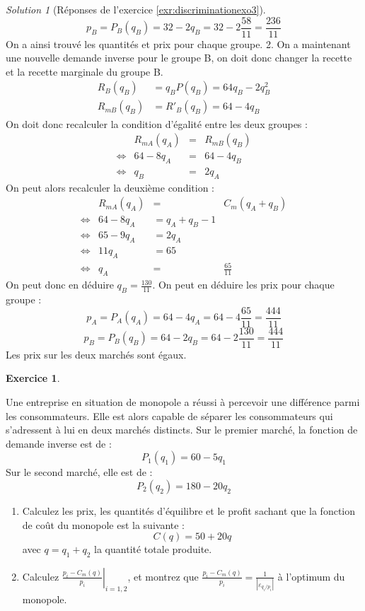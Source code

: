 \documentclass[
]{book}
\providecommand{\tightlist}{%
  \setlength{\itemsep}{0pt}\setlength{\parskip}{0pt}}
\theoremstyle{definition}
\theoremstyle{definition}
\theoremstyle{definition}
\newtheorem{exercise}{Exercice}[chapter]
\theoremstyle{definition}
\theoremstyle{remark}
\newtheorem*{solution}{Solution}
\begin{document}
\begin{solution}[Réponses de l'exercice \ref{exr:discriminationexo3}]
\[p_B=P_B(q_B)=32-2q_B=32-2\frac{58}{11}=\frac{236}{11}\]
On a ainsi trouvé les quantités et prix pour chaque groupe.
2. On a maintenant une nouvelle demande inverse pour le groupe B, on doit donc changer la recette et la recette marginale du groupe B.
\[
\begin{array}{rl}
R_B(q_B)&=q_BP(q_B)=64q_B-2q_B^2\\
R_{mB}(q_B)&=R'_B(q_B)=64-4q_B
\end{array}
\]
On doit donc recalculer la condition d'égalité entre les deux groupes :
\[
\begin{array}{crcl}
&R_{mA}(q_A)&=&R_{mB}(q_B)\\
\Leftrightarrow&64-8q_A&=&64-4q_B\\
\Leftrightarrow&q_B&=&2q_A
\end{array}
\]
On peut alors recalculer la deuxième condition :
\[
\begin{array}{crcl}
&R_{mA}(q_A)&=&C_m(q_A+q_B)\\
\Leftrightarrow&64-8q_A&=q_A+q_B-1\\
\Leftrightarrow&65-9q_A&=2q_A\\
\Leftrightarrow&11q_A&=65\\
\Leftrightarrow&q_A&=&\frac{65}{11}
\end{array}
\]
On peut donc en déduire \(q_B=\frac{130}{11}\). On peut en déduire les prix pour chaque groupe :
\[p_A=P_A(q_A)=64-4q_A=64-4\frac{65}{11}=\frac{444}{11}\]
\[p_B=P_B(q_B)=64-2q_B=64-2\frac{130}{11}=\frac{444}{11}\]
Les prix sur les deux marchés sont égaux.
\end{solution}

\begin{exercise}
\protect\hypertarget{exr:discriminationexo4}{}\label{exr:discriminationexo4}

Une entreprise en situation de monopole a réussi à percevoir
une différence parmi les consommateurs. Elle est alors capable de
séparer les consommateurs qui s'adressent à lui en deux marchés
distincts. Sur le premier marché, la fonction de demande
inverse est de : \[P_{1}(q_{1})=60-5q_{1}\] Sur le second marché,
elle est de : \[P_{2}(q_{2})=180-20q_{2}\]

\begin{enumerate}
\def\labelenumi{\arabic{enumi}.}
\tightlist
\item
  Calculez les prix, les quantités d'équilibre et le profit sachant que la fonction de coût du monopole est la suivante : \[C(q)=50+20q\]
  avec \(q=q_1+q_2\) la quantité totale produite.
\item
  Calculez \(\left.\frac{p_{i}-C_m(q)}{p_i}\right|_{i=1,2}\), et
  montrez que
  \(\frac{p_{i}-C_m(q)}{p_{i}}=\frac{1}{\left|\varepsilon_{q_i/p_i}\right|}\) à l'optimum du monopole.
\end{enumerate}

\end{exercise}
\end{document}
